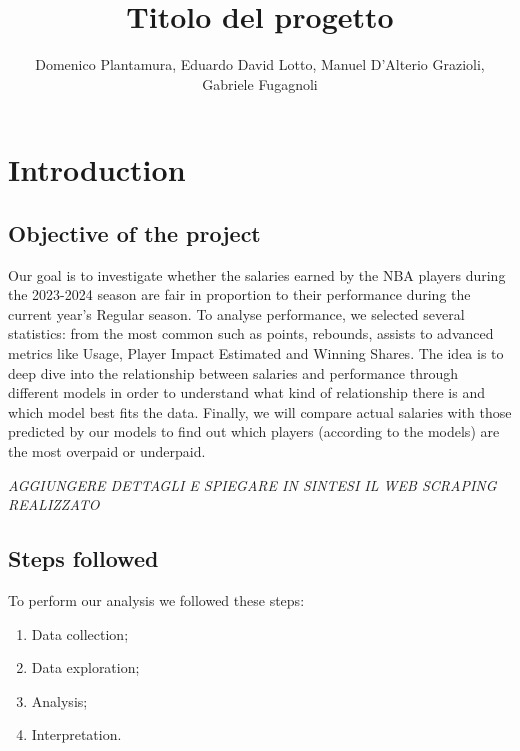 \documentclass[
]{article}
\title{Titolo del progetto}
\author{Domenico Plantamura, Eduardo David Lotto, Manuel D'Alterio
Grazioli, Gabriele Fugagnoli}
\date{}
\begin{document}
\maketitle

{
\setcounter{tocdepth}{2}
\tableofcontents
}
\hfill\break

\hypertarget{introduction}{%
\section{Introduction}\label{introduction}}

\hypertarget{objective-of-the-project}{%
\subsection{Objective of the project}\label{objective-of-the-project}}

Our goal is to investigate whether the salaries earned by the NBA
players during the 2023-2024 season are fair in proportion to their
performance during the current year's Regular season. To analyse
performance, we selected several statistics: from the most common such
as points, rebounds, assists to advanced metrics like Usage, Player
Impact Estimated and Winning Shares. The idea is to deep dive into the
relationship between salaries and performance through different models
in order to understand what kind of relationship there is and which
model best fits the data. Finally, we will compare actual salaries with
those predicted by our models to find out which players (according to
the models) are the most overpaid or underpaid.

\emph{AGGIUNGERE DETTAGLI E SPIEGARE IN SINTESI IL WEB SCRAPING
REALIZZATO}

\hypertarget{steps-followed}{%
\subsection{Steps followed}\label{steps-followed}}

To perform our analysis we followed these steps:

\begin{enumerate}
\def\labelenumi{\arabic{enumi}.}
\item
  Data collection;
\item
  Data exploration;
\item
  Analysis;
\item
  Interpretation.
\end{enumerate}
\end{document}
